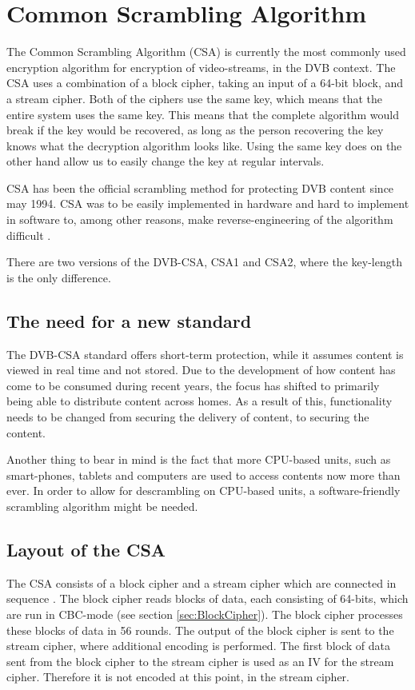 \chapter{Common Scrambling Algorithm} \label{ch:CSA}
The Common Scrambling Algorithm (CSA) is currently the most commonly 
used encryption algorithm for encryption of video-streams, in the DVB 
context. The CSA uses a combination of a block cipher, taking an input 
of a 64-bit block, and a stream cipher. Both of the ciphers use the 
same key, which means that the entire system uses the same key. This 
means that the complete algorithm would break if the key would be 
recovered, as long as the person recovering the key knows what the 
decryption algorithm looks like. Using the same key does on the other 
hand allow us to easily change the key at regular intervals. 
\citep[pp. 271--272]{WeiLi:2007}

CSA has been the official scrambling method for protecting DVB content 
 since may 1994. CSA was to be easily implemented in hardware and hard 
to implement in software to, among other reasons, make 
reverse-engineering of the algorithm difficult \citep{DVBScene:2013}.

There are two versions of the DVB-CSA, CSA1 and CSA2, where the 
key-length is the only difference.
\citep[p. 23]{DVBScene:2013}

\section{The need for a new standard}
The DVB-CSA standard offers short-term protection, while it assumes 
content is viewed in real time and not stored. Due to the development 
of how content has come to be consumed during recent years, the focus 
has shifted to primarily being able to distribute content across homes. 
As a result of this, functionality needs to be changed from securing 
the delivery of content, to securing the content. \citep{Farncombe}

Another thing to bear in mind is the fact that more CPU-based units, 
such as smart-phones, tablets and computers are used to access contents 
now more than ever. In order to allow for descrambling on CPU-based 
units, a software-friendly scrambling algorithm might be needed.

\section{Layout of the CSA}
The CSA consists of a block cipher and a stream cipher which are 
connected in sequence \citep[p. 271]{WeiLi:2007}. The block cipher 
reads blocks of data, each consisting of 64-bits, which are run in 
CBC-mode (see section \ref{sec:BlockCipher}). The block cipher 
processes these blocks of data in 56 rounds. The output of the block 
cipher is sent to the stream cipher, where additional encoding is 
performed. The first block of data sent from the block cipher to the 
stream cipher is used as an IV for the stream cipher. Therefore it is 
not encoded at this point, in the stream cipher. 
\citep{DVBAnalysis:2006}

